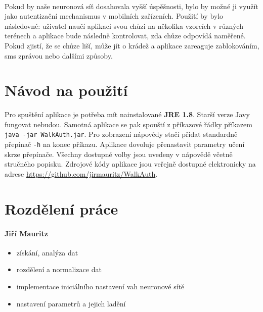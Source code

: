 \documentclass[a4paper, 10pt, twocolumn]{article}
\begin{document}
    \paragraph{}
    Pokud by naše neuronová síť dosahovala vyšší úspěšnosti, bylo by možné ji využít jako autentizační mechanismus v mobilních zařízeních. Použití by bylo následovné: uživatel naučí aplikaci svou chůzi na několika vzorcích v různých terénech a aplikace bude následně kontrolovat, zda chůze odpovídá naměřené. Pokud zjistí, že se chůze liší, může jít o krádež a aplikace zareaguje zablokováním, sms zprávou nebo dalšími způsoby.
    
\appendix
\section{Návod na použití}
Pro spuštění aplikace je potřeba mít nainstalované \textbf{JRE 1.8}. Starší verze Javy fungovat nebudou. Samotná aplikace se pak spouští z příkazové řádky příkazem \texttt{java -jar WalkAuth.jar}. Pro zobrazení nápovědy stačí přidat standardně přepínač \texttt{-h} na konec příkazu. Aplikace dovoluje přenastavit parametry učení skrze přepínače. Všechny dostupné volby jsou uvedeny v nápovědě včetně stručného popisku. Zdrojové kódy aplikace jsou veřejně dostupné elektronicky na adrese \url{https://github.com/jirmauritz/WalkAuth}.

\section{Rozdělení práce}
\paragraph{Jiří Mauritz}
\begin{itemize}
  \item získání, analýza dat
  \item rozdělení a normalizace dat
  \item implementace iniciálního nastavení vah neuronové sítě
  \item nastavení parametrů a jejich ladění
\end{itemize}
\end{document}
